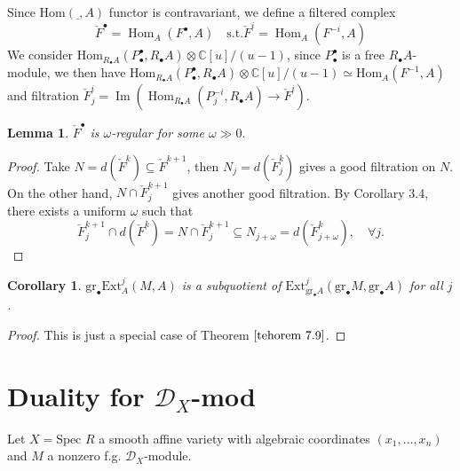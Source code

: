 \documentclass[openany]{book}
\newtheorem{lemma}[theorem]{Lemma}     %
\newtheorem{corollary}[theorem]{Corollary}   %
\theoremstyle{definition} %
\theoremstyle{remark}
\begin{document}
Since $\mathrm{Hom}(\underline{},A)$ functor is contravariant, we define a filtered complex $$ \check{F}^{\bullet} = \operatorname{Hom}_{A}(F^{\bullet}, A) \quad \text{s.t.} \check{F}^{i} = \operatorname{Hom}_{A}(F^{-i}, A) $$We consider $\mathrm{Hom}_{R_{\bullet}A}(P^{\bullet}_{\bullet},R_{\bullet}A)\otimes \mathbb{C}[u] /(u-1)$, since $P^\bullet_{\bullet}$ is a free $R_{\bullet}A$-module, we then have $\mathrm{Hom}_{R_{\bullet}A}(P^\bullet_{\bullet},R_{\bullet}A)\otimes \mathbb{C}[u]/(u-1)\simeq \mathrm{Hom}_{A}(F^{-1},A)$ and filtration  $\check{F}^{i}_{j} = \operatorname{Im}\left( \operatorname{Hom}_{R_{\bullet}A}(P^{-i}_{j} , R_{\bullet}A)\rightarrow \check{F}^{i} \right)$.

\begin{lemma}
    $\check{F}^{\bullet}$ is  $\omega$-regular for some $\omega \gg 0.$
\end{lemma}
\begin{proof}
    Take $N = d(\check{F}^{k}) \subseteq \check{F}^{k+1}$, then $N_j = d(\check{F}_{j}^{k})$ gives a good filtration on $N$.
    On the other hand, $N \cap \check{F}_{j}^{k+1}$ gives another good filtration. By Corollary 3.4, there exists a uniform $\omega$ such that $$ \check{F}_{j}^{k+1} \cap d(\check{F}^{k}) = N \cap \check{F}_{j}^{k+1} \subseteq N_{j+\omega} = d(\check{F}_{j+\omega}^{k}), \quad \forall j. $$
\end{proof}

\begin{corollary}\label{corollary 7.11}
    $\mathrm{gr}_{\bullet}\mathrm{Ext}_A^j (M, A)$ is a subquotient of $\mathrm{Ext}_{\mathrm{gr}_{\bullet} A}^j (\mathrm{gr} _{\bullet}M, \mathrm{gr}_{\bullet} A)$ for all $j$.
\end{corollary}
\begin{proof}
    This is just a special case of Theorem $\ref{tehorem 7.9}$.
\end{proof}

\section{Duality for $\mathcal{D}_{X}$-mod}

Let $X = \text{Spec } R$ a smooth affine variety with algebraic coordinates $(x_1, \ldots, x_n)$ and $M$ a nonzero f.g. $\mathcal{D}_X$-module.
\end{document}
